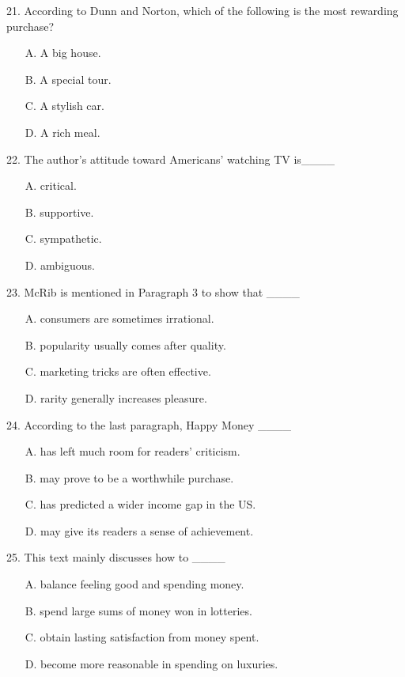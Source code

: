 \documentclass[UTF8,11pt]{ctexart}
\begin{document}
21. According to Dunn and Norton, which of the following is the most rewarding purchase?


\begin{itemize}[leftmargin=2em,itemsep=.2em,topsep=.4em]\item[A.] A big house.
\item[B.] A special tour.
\item[C.] A stylish car.
\item[D.] A rich meal.
\end{itemize}

22. The author’s attitude toward Americans’ watching TV is\_\_\_\_


\begin{itemize}[leftmargin=2em,itemsep=.2em,topsep=.4em]\item[A.] critical.
\item[B.] supportive.
\item[C.] sympathetic.
\item[D.] ambiguous.
\end{itemize}

23. McRib is mentioned in Paragraph 3 to show that \_\_\_\_


\begin{itemize}[leftmargin=2em,itemsep=.2em,topsep=.4em]\item[A.] consumers are sometimes irrational.
\item[B.] popularity usually comes after quality.
\item[C.] marketing tricks are often effective.
\item[D.] rarity generally increases pleasure.
\end{itemize}

24. According to the last paragraph, Happy Money \_\_\_\_


\begin{itemize}[leftmargin=2em,itemsep=.2em,topsep=.4em]\item[A.] has left much room for readers’ criticism.
\item[B.] may prove to be a worthwhile purchase.
\item[C.] has predicted a wider income gap in the US.
\item[D.] may give its readers a sense of achievement.
\end{itemize}

25. This text mainly discusses how to \_\_\_\_


\begin{itemize}[leftmargin=2em,itemsep=.2em,topsep=.4em]\item[A.] balance feeling good and spending money.
\item[B.] spend large sums of money won in lotteries.
\item[C.] obtain lasting satisfaction from money spent.
\item[D.] become more reasonable in spending on luxuries.
\end{itemize}
\end{document}
